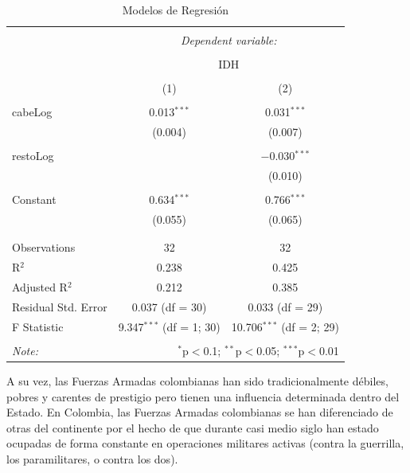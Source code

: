 \documentclass{article}
\begin{document}
\begin{table}[!htbp] \centering 
  \caption{Modelos de Regresión} 
  \label{regresiones} 
\begin{tabular}{@{\extracolsep{5pt}}lcc} 
\\[-1.8ex]\hline 
\hline \\[-1.8ex] 
 & \multicolumn{2}{c}{\textit{Dependent variable:}} \\ 
\cline{2-3} 
\\[-1.8ex] & \multicolumn{2}{c}{IDH} \\ 
\\[-1.8ex] & (1) & (2)\\ 
\hline \\[-1.8ex] 
 cabeLog & 0.013$^{***}$ & 0.031$^{***}$ \\ 
  & (0.004) & (0.007) \\ 
  & & \\ 
 restoLog &  & $-$0.030$^{***}$ \\ 
  &  & (0.010) \\ 
  & & \\ 
 Constant & 0.634$^{***}$ & 0.766$^{***}$ \\ 
  & (0.055) & (0.065) \\ 
  & & \\ 
\hline \\[-1.8ex] 
Observations & 32 & 32 \\ 
R$^{2}$ & 0.238 & 0.425 \\ 
Adjusted R$^{2}$ & 0.212 & 0.385 \\ 
Residual Std. Error & 0.037 (df = 30) & 0.033 (df = 29) \\ 
F Statistic & 9.347$^{***}$ (df = 1; 30) & 10.706$^{***}$ (df = 2; 29) \\ 
\hline 
\hline \\[-1.8ex] 
\textit{Note:}  & \multicolumn{2}{r}{$^{*}$p$<$0.1; $^{**}$p$<$0.05; $^{***}$p$<$0.01} \\ 
\end{tabular} 
\end{table} 
A su vez, las Fuerzas Armadas colombianas han sido tradicionalmente débiles, pobres y carentes de prestigio pero tienen una influencia determinada dentro del Estado. En Colombia, las Fuerzas Armadas colombianas se han diferenciado de otras del continente por el hecho de que durante casi medio siglo han estado ocupadas de forma constante en operaciones militares activas (contra la guerrilla, los paramilitares, o contra los dos).
\end{document}
